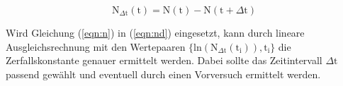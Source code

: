 \begin{equation}
\text{N}_{\Delta\text{t}}(\text{t}) = \text{N}(\text{t}) - \text{N}(\text{t} + \Delta \text{t})
\label{eqn:nd}
\end{equation}

\noindent
Wird Gleichung (\ref{eqn:n}) in (\ref{eqn:nd}) eingesetzt, 
kann durch lineare Ausgleichsrechnung mit den Wertepaaren $\{ \text{ln}(\text{N}_{\Delta \text{t}}(\text{t}_\text{i})),\text{t}_\text{i}\}$
die Zerfallskonstante genauer ermittelt werden.
Dabei sollte das Zeitintervall $\Delta \text{t}$ passend gewählt und eventuell durch einen Vorversuch ermittelt werden.
